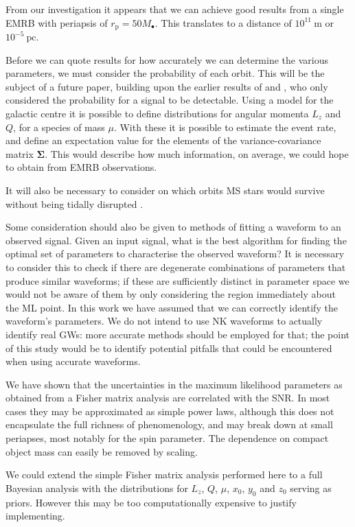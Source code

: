 \documentclass[useAMS,usedcolumn,usegraphicx,usenatbib]{mn2e}
\newcommand{\units}[1]{\ensuremath{~\mathrm{#1}}}
\newcommand{\sub}[1]{\ensuremath{_\mathrm{#1}}}
\begin{document}
From our investigation it appears that we can achieve good results from a single EMRB with periapsis of $r\sub{p} = 50 M_\bullet$. This translates to a distance of $10^{11}\units{m}$ or $10^{-5}\units{pc}$.

Before we can quote results for how accurately we can determine the various parameters, we must consider the probability of each orbit. This will be the subject of a future paper, building upon the earlier results of \citet{Rubbo2006} and \citet{Hopman2007}, who only considered the probability for a signal to be detectable. Using a model for the galactic centre it is possible to define distributions for angular momenta $L_z$ and $Q$, for a species of mass $\mu$. With these it is possible to estimate the event rate, and define an expectation value for the elements of the variance-covariance matrix $\boldsymbol{\Sigma}$. This would describe how much information, on average, we could hope to obtain from EMRB observations.

It will also be necessary to consider on which orbits MS stars would survive without being tidally disrupted \citep{Kobayashi2004}.

Some consideration should also be given to methods of fitting a waveform to an observed signal. Given an input signal, what is the best algorithm for finding the optimal set of parameters to characterise the observed waveform? It is necessary to consider this to check if there are degenerate combinations of parameters that produce similar waveforms; if these are sufficiently distinct in parameter space we would not be aware of them by only considering the region immediately about the ML point. In this work we have assumed that we can correctly identify the waveform's parameters. We do not intend to use NK waveforms to actually identify real GWs: more accurate methods should be employed for that; the point of this study would be to identify potential pitfalls that could be encountered when using accurate waveforms.

We have shown that the uncertainties in the maximum likelihood parameters as obtained from a Fisher matrix analysis are correlated with the SNR. In most cases they may be approximated as simple power laws, although this does not encapsulate the full richness of phenomenology, and may break down at small periapses, most notably for the spin parameter. The dependence on compact object mass can easily be removed by scaling.

We could extend the simple Fisher matrix analysis performed here to a full Bayesian analysis with the distributions for $L_z$, $Q$, $\mu$, $x_0$, $y_0$ and $z_0$ serving as priors. However this may be too computationally expensive to justify implementing.
\end{document}
